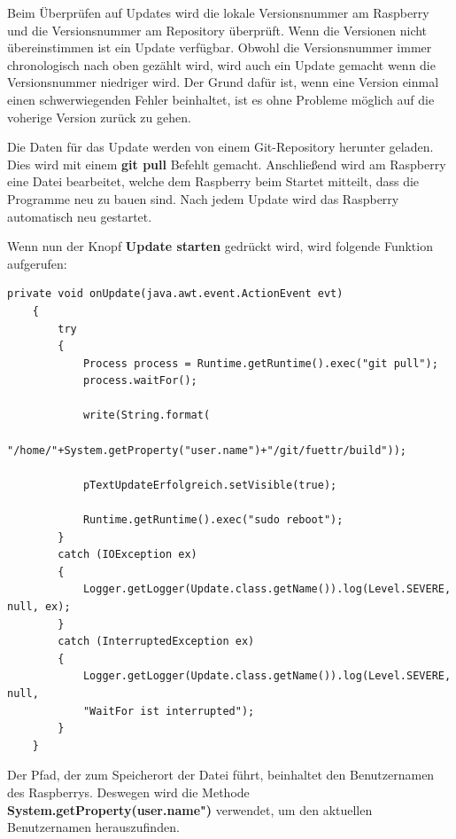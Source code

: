 \vspace{10pt}

Beim Überprüfen auf Updates wird die lokale Versionsnummer am Raspberry und die Versionsnummer am Repository überprüft. Wenn die Versionen nicht übereinstimmen ist ein Update verfügbar. Obwohl die Versionsnummer immer chronologisch nach oben gezählt wird, wird auch ein Update gemacht wenn die Versionsnummer niedriger wird. Der Grund dafür ist, wenn eine Version einmal einen schwerwiegenden Fehler beinhaltet, ist es ohne Probleme möglich auf die voherige Version zurück zu gehen. 

\vspace{10pt}

Die Daten für das Update werden von einem Git-Repository herunter geladen. Dies wird mit einem \textbf{git pull} Befehlt gemacht. Anschließend wird am Raspberry eine Datei bearbeitet, welche dem Raspberry beim Startet mitteilt, dass die Programme neu zu bauen sind. Nach jedem Update wird das Raspberry automatisch neu gestartet.

\vspace{10pt}

Wenn nun der Knopf \textbf{Update starten} gedrückt wird, wird folgende Funktion aufgerufen:
\begin{lstlisting}[style=JavaStyle, caption= Update]
    private void onUpdate(java.awt.event.ActionEvent evt)                          
    {                              
        try
        {
            Process process = Runtime.getRuntime().exec("git pull");
            process.waitFor();
            
			write(String.format(
			"/home/"+System.getProperty("user.name")+"/git/fuettr/build"));
            
            pTextUpdateErfolgreich.setVisible(true);
            
            Runtime.getRuntime().exec("sudo reboot");
        }
        catch (IOException ex)
        {
            Logger.getLogger(Update.class.getName()).log(Level.SEVERE, null, ex);
        }
        catch (InterruptedException ex)
        {
            Logger.getLogger(Update.class.getName()).log(Level.SEVERE, null, 
            "WaitFor ist interrupted");
        }        
    }
\end{lstlisting}
Der Pfad, der zum Speicherort der Datei führt, beinhaltet den Benutzernamen des Raspberrys. Deswegen wird die Methode \textbf{System.getProperty(\grqq{}user.name")} verwendet, um den aktuellen Benutzernamen herauszufinden.


